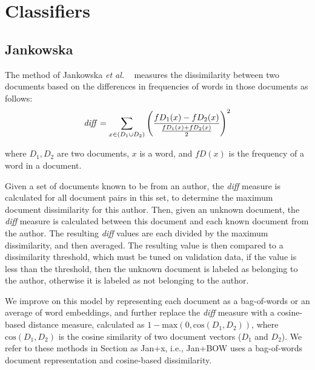 \documentclass[11pt]{article}
\begin{document}
\section{Classifiers}\label{sec:classifiers}

%


\subsection{Jankowska}\label{Jankowska}
The method of Jankowska \emph{et al.} ~\cite{jankowska2014} measures
the dissimilarity between two documents based on the differences in
frequencies of words in those documents as follows:
\begin{equation*}\label{diff}
\small
\mathit{diff} = {\sum_{x\in(D_1 \cup
    D_2)}{\left(\dfrac{fD_1(x)-fD_2(x)}{\frac{fD_1(x)+fD_2(x)}{2}}\right)}^2}
\end{equation*}

\noindent
where $D_1, D_2$ are two documents, $x$ is a word, and $fD(x)$ is the
frequency of a word in a document.

Given a set of documents known to be from an author, the \textit{diff}
measure is calculated for all document pairs in this set, to determine
the maximum document dissimilarity for this author. Then, given an
unknown document, the \textit{diff} measure is calculated between this
document and each known document from the author. The resulting
\textit{diff} values are each divided by the maximum dissimilarity,
and then averaged. The resulting value is then compared to a
dissimilarity threshold, which must be tuned on validation data, if
the value is less than the threshold, then the unknown document is
labeled as belonging to the author, otherwise it is labeled as not
belonging to the author.

We improve on this model by representing each document as a
bag-of-words or an average of word embeddings, and further
replace the \textit{diff} measure with a cosine-based distance
measure, calculated as $1 - \textrm{max}(0, \textrm{cos}(D_1, D_2))$,
where $\textrm{cos}(D_1, D_2)$ is the cosine similarity of two
document vectors ($D_1$ and $D_2$). We refer to these methods in
Section \label{} as Jan+x, i.e., Jan+BOW uses a bag-of-words document
representation and cosine-based dissimilarity.

\end{document}
